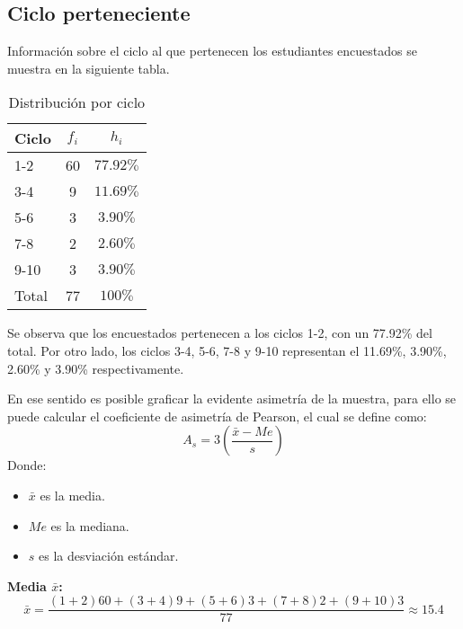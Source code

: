 \subsection{Ciclo perteneciente}

Información sobre el ciclo al que pertenecen los estudiantes encuestados se muestra en la siguiente tabla.

\begin{multicols}{2}
  \begin{minipage}{\linewidth}
    \centering
	\begin{table}[H]
	  \centering
	  \caption{Distribución por ciclo}
	  \renewcommand{\arraystretch}{1.2}
	  \begin{tabular}{l c c }
		\hline
		Ciclo & \(f_i\) & \(h_i\) \\
		\hline
		1-2 & 60 & \(77.92\%\) \\
		3-4 & 9 & \(11.69\%\) \\
		5-6 & 3 & \(3.90\%\) \\
		7-8 & 2 & \(2.60\%\) \\
		9-10 & 3 & \(3.90\%\) \\
		\hline
		Total & 77 & \(100\%\) \\
		\hline
	  \end{tabular}
	\end{table}
  \end{minipage}

  Se observa que los encuestados pertenecen a los ciclos 1-2, con un 77.92\% del total. Por otro lado, los ciclos 3-4, 5-6, 7-8 y 9-10 representan el 11.69\%, 3.90\%, 2.60\% y 3.90\% respectivamente.

  \columnbreak

  En ese sentido es posible graficar la evidente asimetría de la muestra, para ello se puede calcular el coeficiente de asimetría de Pearson, el cual se define como:
  \begin{equation*}
    A_s = 3 \left( \frac{\bar{x} - Me}{s} \right)
  \end{equation*}
  Donde:
  \begin{itemize}
    \item \(\bar{x}\) es la media.
    \item \(Me\) es la mediana.
    \item \(s\) es la desviación estándar.
  \end{itemize}
\end{multicols}
\vspace{-0.5cm}  
  \textbf{Media \(\bar{x}\):}
  \begin{equation*}
    \bar{x} = \frac{(1+2)60 + (3+4)9 + (5+6)3 + (7+8)2 + (9+10)3}{77} \approx 15.4
  \end{equation*}

